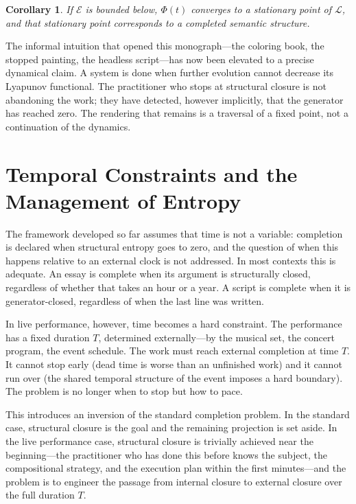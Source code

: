 \documentclass[11pt, twoside]{article}
\theoremstyle{plain}
\newtheorem{corollary}[theorem]{Corollary}
\theoremstyle{definition}
\theoremstyle{remark}
\begin{document}
\begin{corollary}
If $\mathcal{E}$ is bounded below, $\Phi(t)$ converges to a stationary point of $\mathcal{L}$, and that stationary point corresponds to a completed semantic structure.
\end{corollary}

The informal intuition that opened this monograph---the coloring book, the stopped painting, the headless script---has now been elevated to a precise dynamical claim. A system is done when further evolution cannot decrease its Lyapunov functional. The practitioner who stops at structural closure is not abandoning the work; they have detected, however implicitly, that the generator has reached zero. The rendering that remains is a traversal of a fixed point, not a continuation of the dynamics.

\section{Temporal Constraints and the Management of Entropy}
\label{sec:temporal}

The framework developed so far assumes that time is not a variable: completion is declared when structural entropy goes to zero, and the question of when this happens relative to an external clock is not addressed. In most contexts this is adequate. An essay is complete when its argument is structurally closed, regardless of whether that takes an hour or a year. A script is complete when it is generator-closed, regardless of when the last line was written.

In live performance, however, time becomes a hard constraint. The performance has a fixed duration $T$, determined externally---by the musical set, the concert program, the event schedule. The work must reach external completion at time $T$. It cannot stop early (dead time is worse than an unfinished work) and it cannot run over (the shared temporal structure of the event imposes a hard boundary). The problem is no longer when to stop but how to pace.

This introduces an inversion of the standard completion problem. In the standard case, structural closure is the goal and the remaining projection is set aside. In the live performance case, structural closure is trivially achieved near the beginning---the practitioner who has done this before knows the subject, the compositional strategy, and the execution plan within the first minutes---and the problem is to engineer the passage from internal closure to external closure over the full duration $T$.
\end{document}
